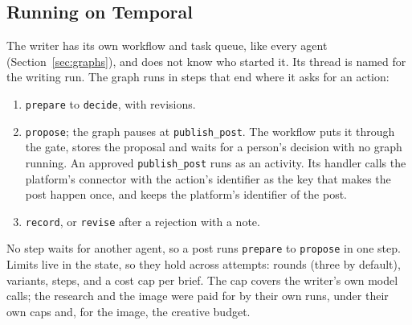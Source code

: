 \documentclass[11pt,a4paper]{article}
\begin{document}
\subsection{Running on Temporal}
The writer has its own workflow and task queue, like every agent (Section~\ref{sec:graphs}), and does not know who started it. Its thread is named for the writing run. The graph runs in steps that end where it asks for an action:
\begin{enumerate}
  \item \texttt{prepare} to \texttt{decide}, with revisions.
  \item \texttt{propose}; the graph pauses at \texttt{publish\_post}. The workflow puts it through the gate, stores the proposal and waits for a person's decision with no graph running. An approved \texttt{publish\_post} runs as an activity. Its handler calls the platform's connector with the action's identifier as the key that makes the post happen once, and keeps the platform's identifier of the post.
  \item \texttt{record}, or \texttt{revise} after a rejection with a note.
\end{enumerate}
No step waits for another agent, so a post runs \texttt{prepare} to \texttt{propose} in one step. Limits live in the state, so they hold across attempts: rounds (three by default), variants, steps, and a cost cap per brief. The cap covers the writer's own model calls; the research and the image were paid for by their own runs, under their own caps and, for the image, the creative budget.
\end{document}
